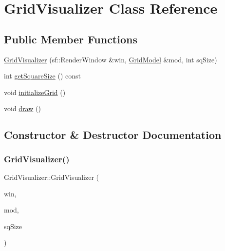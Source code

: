 \hypertarget{classGridVisualizer}{}\section{Grid\+Visualizer Class Reference}
\label{classGridVisualizer}
\subsection*{Public Member Functions}
\begin{DoxyCompactItemize}
\item 
\hyperlink{classGridVisualizer_a68b97ea51bcb32ad2bb5fb0795087f5c}{Grid\+Visualizer} (sf\+::\+Render\+Window \&win, \hyperlink{classGridModel}{Grid\+Model} \&mod, int sq\+Size)
\item 
int \hyperlink{classGridVisualizer_aba463eb8e37c7c12b80faacc9ee4665b}{get\+Square\+Size} () const
\item 
void \hyperlink{classGridVisualizer_ac47a55b7422750af85e0d14ba789cc4a}{initialize\+Grid} ()
\item 
void \hyperlink{classGridVisualizer_abff2eaff8b5a6437a1e6b709b9bb3e28}{draw} ()
\end{DoxyCompactItemize}


\subsection{Constructor \& Destructor Documentation}
\mbox{\label{classGridVisualizer_a68b97ea51bcb32ad2bb5fb0795087f5c}} 
\subsubsection{\texorpdfstring{Grid\+Visualizer()}{GridVisualizer()}}
{\footnotesize\ttfamily Grid\+Visualizer\+::\+Grid\+Visualizer (\begin{DoxyParamCaption}\item[{sf\+::\+Render\+Window \&}]{win,  }\item[{\hyperlink{classGridModel}{Grid\+Model} \&}]{mod,  }\item[{int}]{sq\+Size }\end{DoxyParamCaption})\hspace{0.3cm}{\ttfamily [inline]}}




